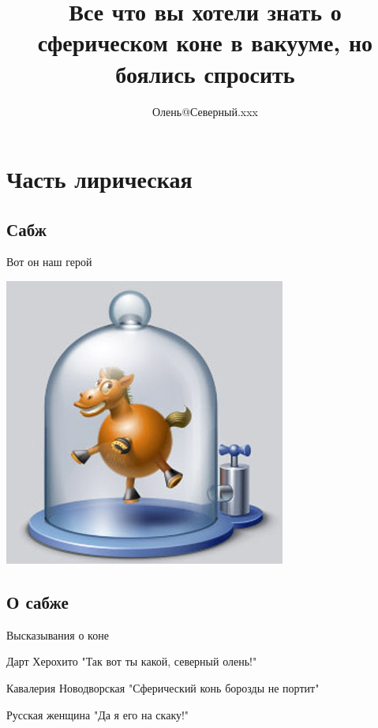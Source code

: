 \documentclass[ignorenonframetext,hyperref={pdftex,unicode}]{beamer}
\title{Все что вы хотели знать о сферическом коне в вакууме, но боялись спросить} %
\author[Олень]{Олень@Северный.xxx} %
\begin{document}

\frame{\titlepage} %


\section{Часть лирическая} %
\subsection{Сабж} %

\begin{frame}{Вот он наш герой} %
	\begin{center}
 		\includegraphics[height=.8\textheight]{Sphere_horse} %
	\end{center}
\end{frame} %

\subsection{О сабже}
\begin{frame}{Высказывания о коне}
	\pause    %
	\begin{block}{Дарт Херохито}
 		"Так вот ты какой, северный олень!"
	\end{block}
	\pause
	\begin{block}{Кавалерия Новодворская}
 		"Сферический конь борозды не портит"
	\end{block}
	\pause
	\begin{block}{Русская женщина}
 		"Да я его на скаку!"
	\end{block}
\end{frame}
\end{document}
